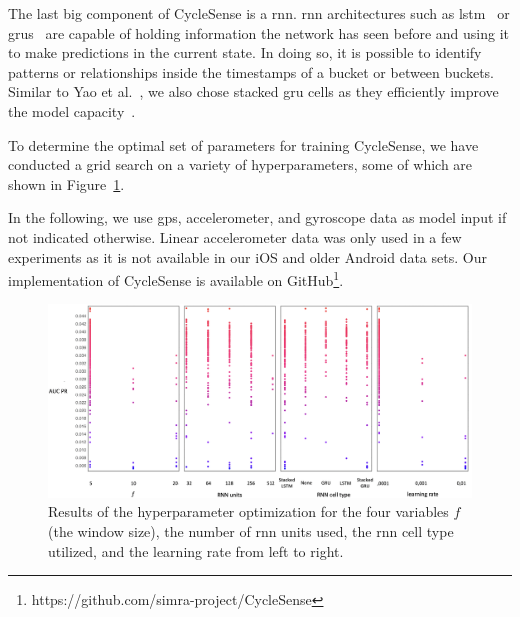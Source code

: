The last big component of CycleSense is a \ac{rnn}.
\ac{rnn} architectures such as \ac{lstm}~\cite{hochreiter1997long} or \acp{gru}~\cite{chung2014empirical} are capable of holding information the network has seen before and using it to make predictions in the current state.
In doing so, it is possible to identify patterns or relationships inside the timestamps of a bucket or between buckets.
Similar to Yao et al.\ \cite{yao2017deepsense}, we also chose stacked \ac{gru} cells as they efficiently improve the model capacity~\cite{goodfellow2016deep}.

To determine the optimal set of parameters for training CycleSense, we have conducted a grid search on a variety of hyperparameters, some of which are shown in Figure~\ref{fig:hpo}.

In the following, we use \ac{gps}, accelerometer, and gyroscope data as model input if not indicated otherwise.
Linear accelerometer data was only used in a few experiments as it is not available in our iOS and older Android data sets.
Our implementation of CycleSense is available on GitHub\footnote{https://github.com/simra-project/CycleSense}.

\begin{figure}[t]
	\centering
	\includegraphics[width=\textwidth]{fig/hpo_results.png}
	\caption{Results of the hyperparameter optimization for the four variables $f$ (the window size), the number of \ac{rnn} units used, the \ac{rnn} cell type utilized, and the learning rate from left to right.}
	\label{fig:hpo}
\end{figure}

